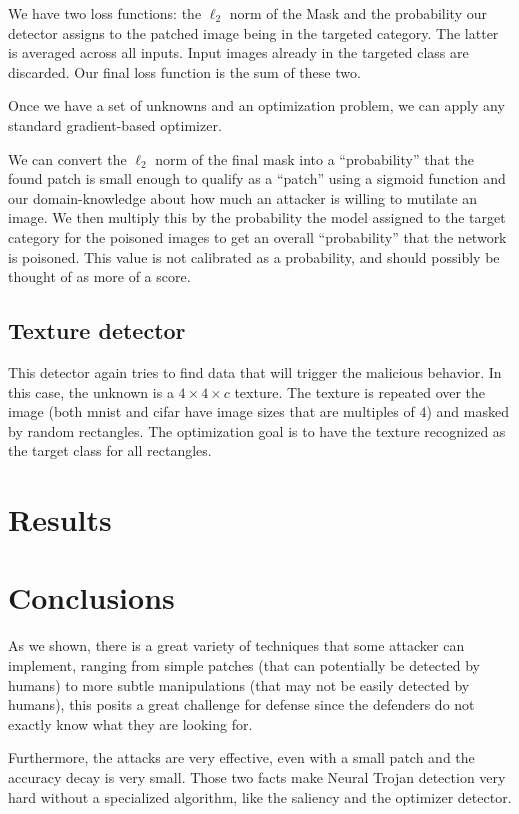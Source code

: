 \documentclass[letterpaper, 10 pt, conference]{ieeeconf}  %
\begin{document}
We have two loss functions: the $\ell_2$ norm of the Mask and the
probability our detector assigns to the patched image being in the
targeted category.  The latter is averaged across all inputs.  Input
images already in the targeted class are discarded.  Our final loss
function is the sum of these two.

Once we have a set of unknowns and an optimization problem, we can
apply any standard gradient-based optimizer.

We can convert the $\ell_2$ norm of the final mask into a ``probability''
that the found patch is small enough to qualify as a ``patch'' using a
sigmoid function and our domain-knowledge about how much an attacker
is willing to mutilate an image.  We then multiply this by the
probability the model assigned to the target category for the poisoned
images to get an overall ``probability'' that the network is
poisoned.  This value is not calibrated as a probability, and should
possibly be thought of as more of a score.


\subsection{Texture detector}


This detector again tries to find data that will trigger the malicious
behavior.  In this case, the unknown is a $4\times 4\times c$ texture.  The
texture is repeated over the image (both mnist and cifar have image
sizes that are multiples of 4) and masked by random rectangles.  The
optimization goal is to have the texture recognized as the target
class for all rectangles.

\section{Results}


\section{Conclusions}

As we shown, there is a great variety of techniques that some attacker can
implement, ranging from simple patches (that can potentially be detected by
humans) to more subtle manipulations (that may not be easily detected
by humans), this posits a great challenge for defense since the defenders do
not exactly know what they are looking for.

Furthermore, the attacks are very effective, even with a small patch and the
accuracy decay is very small. Those two facts make Neural Trojan detection
very hard without a specialized algorithm, like the saliency and the
optimizer detector.
\end{document}
